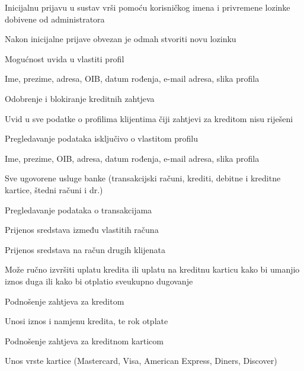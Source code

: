 \begin{packed_enum}
				\begin{packed_enum}
					
					\item Inicijalnu prijavu u sustav vrši pomoću korisničkog imena i privremene lozinke dobivene od administratora
					\begin{packed_enum}
						\item Nakon inicijalne prijave obvezan je odmah stvoriti novu lozinku
					\end{packed_enum}
					\item Mogućnost uvida u vlastiti profil
					\begin{packed_enum}
						\item Ime, prezime, adresa, OIB, datum rođenja, e-mail adresa, slika profila
					\end{packed_enum}
					\item Odobrenje i blokiranje kreditnih zahtjeva
					\item Uvid u sve podatke o profilima klijentima čiji zahtjevi za kreditom nisu riješeni
					
				\end{packed_enum}
				
				\item	\underbar{Klijent banke - inicijator}
				
				\begin{packed_enum}
					
					\item Pregledavanje podataka isključivo o vlastitom profilu
					\begin{packed_enum}
						\item Ime, prezime, OIB, adresa, datum rođenja, e-mail adresa, slika profila
						\item Sve ugovorene usluge banke (transakcijski računi, krediti, debitne i kreditne kartice, štedni računi i dr.)
					\end{packed_enum}
					\item Pregledavanje podataka o transakcijama
					\item Prijenos sredstava između vlastitih računa
					\item Prijenos sredstava na račun drugih klijenata
					\item Može ručno izvršiti uplatu kredita ili uplatu na kreditnu karticu kako bi umanjio iznos duga ili kako bi otplatio sveukupno dugovanje
					\item Podnošenje zahtjeva za kreditom
					\begin{packed_enum}
						\item Unosi iznos i namjenu kredita, te rok otplate
					\end{packed_enum}
					\item Podnošenje zahtjeva za kreditnom karticom
					\begin{packed_enum}
						\item Unos vrste kartice (Mastercard, Visa, American Express, Diners, Discover)
					\end{packed_enum}
					

\end{packed_enum}
\end{packed_enum}
